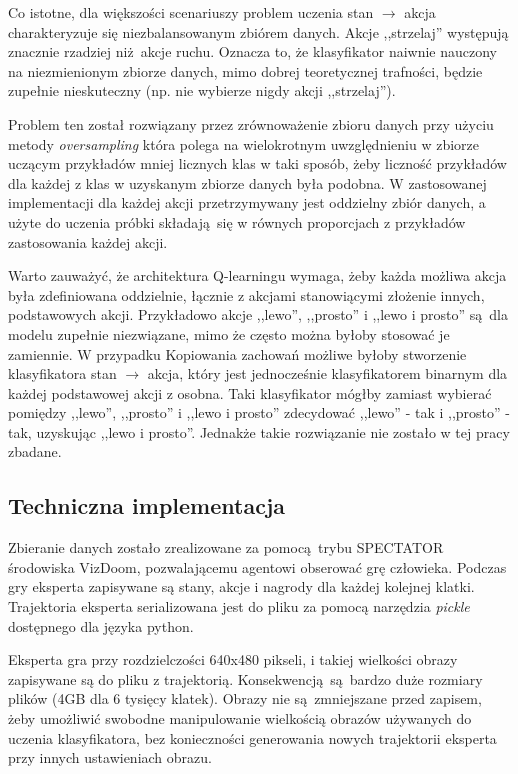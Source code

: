 Co istotne, dla większości scenariuszy problem uczenia stan $\to$ akcja charakteryzuje się niezbalansowanym zbiórem danych. Akcje ,,strzelaj'' występują znacznie rzadziej niż akcje ruchu. Oznacza to, że klasyfikator naiwnie nauczony na niezmienionym zbiorze danych, mimo dobrej teoretycznej trafności, będzie zupełnie nieskuteczny (np. nie wybierze nigdy akcji ,,strzelaj'').

Problem ten został rozwiązany przez zrównoważenie zbioru danych przy użyciu metody \textit{oversampling} która polega na wielokrotnym uwzględnieniu w zbiorze uczącym przykładów mniej licznych klas w taki sposób, żeby liczność przykładów dla każdej z klas w uzyskanym zbiorze danych była podobna. W zastosowanej implementacji dla każdej akcji przetrzymywany jest oddzielny zbiór danych, a użyte do uczenia próbki składają się w równych proporcjach z przykładów zastosowania każdej akcji. 

Warto zauważyć, że architektura Q-learningu wymaga, żeby każda możliwa akcja była zdefiniowana oddzielnie, łącznie z akcjami stanowiącymi złożenie innych, podstawowych akcji. Przykładowo akcje ,,lewo'', ,,prosto'' i ,,lewo i prosto'' są dla modelu zupełnie niezwiązane, mimo że często można byłoby stosować je zamiennie. W przypadku Kopiowania zachowań możliwe byłoby stworzenie klasyfikatora  stan $\to$ akcja, który jest jednocześnie klasyfikatorem binarnym dla każdej podstawowej akcji z osobna. Taki klasyfikator mógłby zamiast wybierać pomiędzy ,,lewo'', ,,prosto'' i ,,lewo i prosto'' zdecydować ,,lewo'' - tak i ,,prosto'' - tak, uzyskując ,,lewo i prosto''. Jednakże takie rozwiązanie nie zostało w tej pracy zbadane.

\subsection{Techniczna implementacja} \label{behavioral_cloning_tech}

Zbieranie danych zostało zrealizowane za pomocą trybu SPECTATOR środowiska VizDoom, pozwalającemu agentowi obserować grę człowieka. Podczas gry eksperta zapisywane są stany, akcje i nagrody dla każdej kolejnej klatki. Trajektoria eksperta serializowana jest do pliku za pomocą narzędzia \textit{pickle} dostępnego dla języka python.

Eksperta gra przy rozdzielczości 640x480 pikseli, i takiej wielkości obrazy zapisywane są do pliku z trajektorią. Konsekwencją są bardzo duże rozmiary plików (4GB dla 6 tysięcy klatek). Obrazy nie są zmniejszane przed zapisem, żeby umożliwić swobodne manipulowanie wielkością obrazów używanych do uczenia klasyfikatora, bez konieczności generowania nowych trajektorii eksperta przy innych ustawieniach obrazu.

